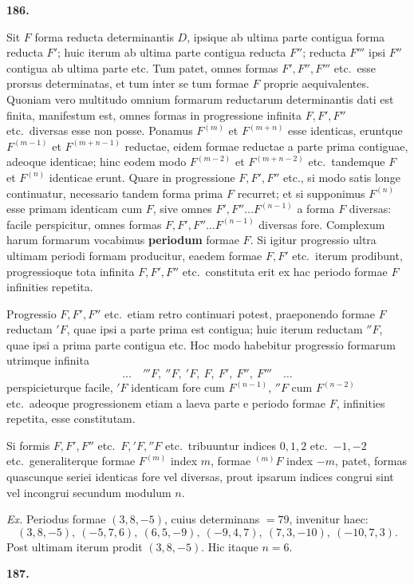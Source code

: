 \documentclass[12pt,a4paper]{article}
\theoremstyle{plain}
\theoremstyle{definition}
\theoremstyle{remark}
\begin{document}
\textbf{186.}

Sit $F$ forma reducta determinantis $D$, ipsique ab ultima parte contigua forma reducta $F'$; huic iterum ab ultima parte contigua reducta $F''$; reducta $F'''$ ipsi $F''$ contigua ab ultima parte etc. Tum patet, omnes formas $F',F'',F'''$ etc.\ esse prorsus determinatas, et tum inter se tum formae $F$ proprie aequivalentes. Quoniam vero multitudo omnium formarum reductarum determinantis dati est finita, manifestum est, omnes formas in progressione infinita $F,F',F''$ etc.\ diversas esse non posse. Ponamus $F^{(m)}$ et $F^{(m+n)}$ esse identicas, eruntque $F^{(m-1)}$ et $F^{(m+n-1)}$ reductae, eidem formae reductae a parte prima contiguae, adeoque identicae; hinc eodem modo $F^{(m-2)}$ et $F^{(m+n-2)}$ etc.\ tandemque $F$ et $F^{(n)}$ identicae erunt. Quare in progressione $F,F',F''$ etc., si modo satis longe continuatur, necessario tandem forma prima $F$ recurret; et si supponimus $F^{(n)}$ esse primam identicam cum $F$, sive omnes $F',F''\ldots F^{(n-1)}$ a forma $F$ diversas: facile perspicitur, omnes formas $F,F',F''\ldots F^{(n-1)}$ diversas fore. Complexum harum formarum vocabimus \textbf{periodum} formae $F$. Si igitur progressio ultra ultimam periodi formam producitur, eaedem formae $F,F'$ etc.\ iterum prodibunt, progressioque tota infinita $F,F',F''$ etc.\ constituta erit ex hac periodo formae $F$ infinities repetita.

Progressio $F,F',F''$ etc.\ etiam retro continuari potest, praeponendo formae $F$ reductam $'F$, quae ipsi a parte prima est contigua; huic iterum reductam $''F$, quae ipsi a prima parte contigua etc. Hoc modo habebitur progressio formarum utrimque infinita
\[\ldots\quad'''F,\ ''F,\ 'F,\ F,\ F',\ F'',\ F'''\quad\ldots\]
perspicieturque facile, $'F$ identicam fore cum $F^{(n-1)}$, $''F$ cum $F^{(n-2)}$ etc.\ adeoque progressionem etiam a laeva parte e periodo formae $F$, infinities repetita, esse constitutam.

Si formis $F,F',F''$ etc.\ $F,'F,''F$ etc.\ tribuuntur indices $0,1,2$ etc.\ $-1,-2$ etc.\ generaliterque formae $F^{(m)}$ index $m$, formae $^{(m)}F$ index $-m$, patet, formas quascunque seriei identicas fore vel diversas, prout ipsarum indices congrui sint vel incongrui secundum modulum $n$.

\textit{Ex.} Periodus formae $(3,8,-5)$, cuius determinans $=79$, invenitur haec:
\[(3,8,-5),\ (-5,7,6),\ (6,5,-9),\ (-9,4,7),\ (7,3,-10),\ (-10,7,3).\]
Post ultimam iterum prodit $(3,8,-5)$. Hic itaque $n=6$.

\textbf{187.}
\end{document}
